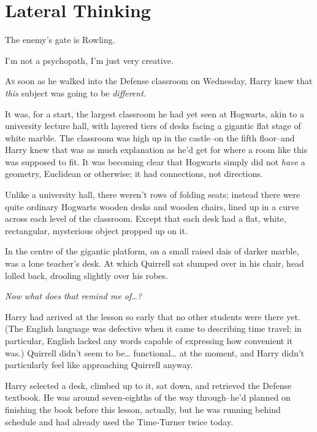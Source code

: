 \chapter{Lateral Thinking}

\begin{chapterOpeningAuthorNote}
The enemy's gate is Rowling.
\end{chapterOpeningAuthorNote}
\begin{chapterOpeningQuote}
I'm not a psychopath, I'm just very creative.
\end{chapterOpeningQuote}

\lettrine{A}{s} soon as he walked into the Defense classroom on Wednesday, Harry knew that \emph{this} subject was going to be \emph{different}.

It was, for a start, the largest classroom he had yet seen at Hogwarts, akin to a university lecture hall, with layered tiers of desks facing a gigantic flat stage of white marble. The classroom was high up in the castle\---on the fifth floor\---and Harry knew that was as much explanation as he'd get for where a room like this was supposed to fit. It was becoming clear that Hogwarts simply did not \emph{have} a geometry, Euclidean or otherwise; it had connections, not directions.

Unlike a university hall, there weren't rows of folding seats; instead there were quite ordinary Hogwarts wooden desks and wooden chairs, lined up in a curve across each level of the classroom. Except that each desk had a flat, white, rectangular, mysterious object propped up on it.

In the centre of the gigantic platform, on a small raised dais of darker marble, was a lone teacher's desk. At which Quirrell sat slumped over in his chair, head lolled back, drooling slightly over his robes.

\emph{Now what does that remind me of{\ldots}?}

Harry had arrived at the lesson so early that no other students were there yet. (The English language was defective when it came to describing time travel; in particular, English lacked any words capable of expressing how convenient it was.) Quirrell didn't seem to be{\ldots} functional{\ldots} at the moment, and Harry didn't particularly feel like approaching Quirrell anyway.

Harry selected a desk, climbed up to it, sat down, and retrieved the Defense textbook. He was around seven-eighths of the way through\---he'd planned on finishing the book before this lesson, actually, but he was running behind schedule and had already used the Time-Turner twice today.

